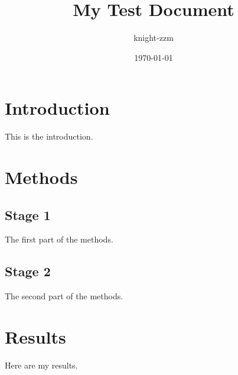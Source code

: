 \documentclass[a4paper,12pt]{report}
\begin{document}
\title{My Test Document}
\author{knight-zzm}
\date{\today}
\maketitle

\section{Introduction}
This is the introduction.

\section{Methods}

\subsection{Stage 1}
The first part of the methods.

\subsection{Stage 2}
The second part of the methods.

\section{Results}
Here are my results.
\end{document}
